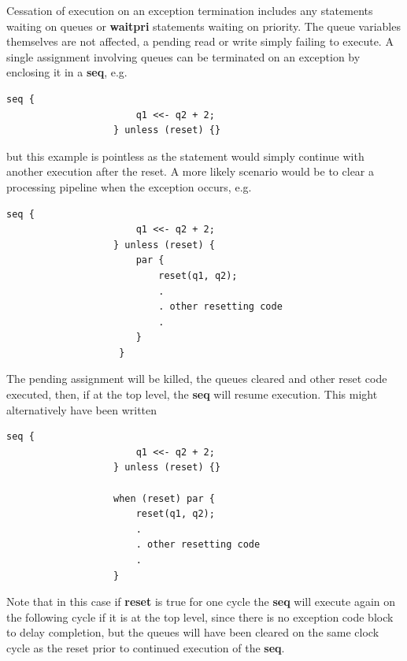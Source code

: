             Cessation of execution on an exception termination includes any
            statements waiting on queues or {\bf waitpri} statements waiting on
            priority. The queue variables themselves are not affected, a pending
            read or write simply failing to execute. A single assignment
            involving queues can be terminated on an exception by enclosing it
            in a {\bf seq}, e.g.
            \begin{lstlisting}[gobble=12, language=threepl]
                   seq {
                       q1 <<- q2 + 2;
                   } unless (reset) {}
            \end{lstlisting}
            but this example is pointless as the statement would simply
            continue with another execution after the reset. A more likely
            scenario would be to clear a processing pipeline when the exception
            occurs, e.g.
            \begin{lstlisting}[gobble=12, language=threepl]
                   seq {
                       q1 <<- q2 + 2;
                   } unless (reset) {
                       par {
                           reset(q1, q2);
                           .
                           . other resetting code
                           .
                       }
                    }
            \end{lstlisting}
            The pending assignment will be killed, the queues cleared and other
            reset code executed, then, if at the top level, the {\bf seq} will
            resume execution.
            This might alternatively have been written
            \begin{lstlisting}[gobble=12, language=threepl]
                   seq {
                       q1 <<- q2 + 2;
                   } unless (reset) {}
                   
                   when (reset) par {
                       reset(q1, q2);
                       .
                       . other resetting code
                       .
                   }
            \end{lstlisting}
            Note that in this case if {\bf reset} is true for one cycle the {\bf
            seq} will execute again on the following cycle if it is at the top
            level, since there is no exception code block to delay completion,
            but the queues will have been cleared on the same clock cycle as the
            reset prior to continued execution of the {\bf seq}.

